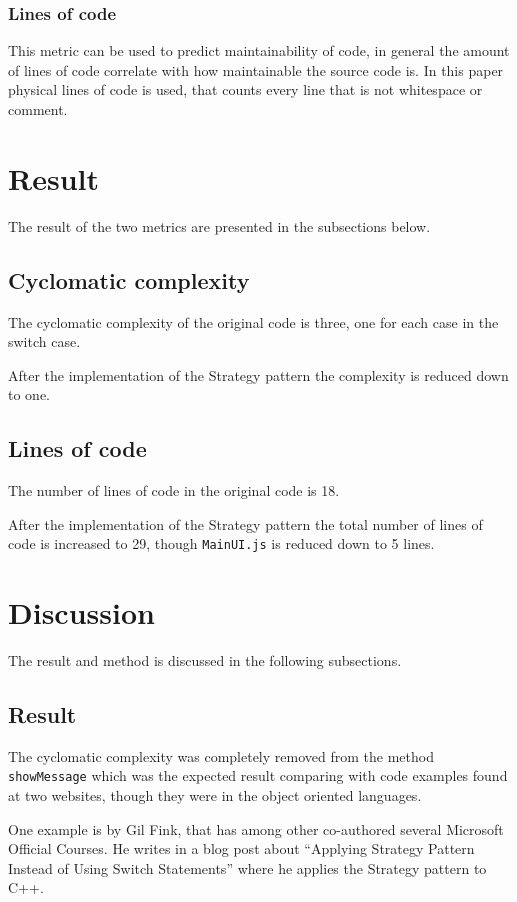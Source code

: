 \documentclass[conference, a4paper]{IEEEtran}
\begin{document}
\subsubsection{Lines of code}
This metric can be used to predict maintainability of code, in general the amount of lines of code correlate with how maintainable the source code is. In this paper physical lines of code is used, that counts every line that is not whitespace or comment.

\section{Result}
The result of the two metrics are presented in the subsections below.

\subsection{Cyclomatic complexity}
The cyclomatic complexity of the original code is three, one for each case in the switch case.

After the implementation of the Strategy pattern the complexity is reduced down to one.

\subsection{Lines of code}
The number of lines of code in the original code is 18.

After the implementation of the Strategy pattern the total number of lines of code is increased to 29, though \texttt{MainUI.js} is reduced down to 5 lines.

\section{Discussion}
The result and method is discussed in the following subsections.

\subsection{Result}
The cyclomatic complexity was completely removed from the method \texttt{showMessage} which was the expected result comparing with code examples found at two websites, though they were in the object oriented languages.

One example is by Gil Fink, that has among other co-authored several Microsoft Official Courses. He writes in a blog post about ``Applying Strategy Pattern Instead of Using Switch Statements'' where he applies the Strategy pattern to C++.~\cite{bibitem:GilFink}
\end{document}
